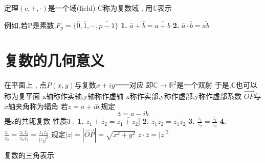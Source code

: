 \documentclass[UTF8,11pt]{ctexart}
\theoremstyle{cnthm}
\begin{document}
	定理$(c , + , \cdot)$是一个域(field)
	C称为复数域 , 用$\mathbb{C}$表示
	
	例如,若P是素数,$F_p = \{ \bar{0} , \bar{1} , \cdots , \bar{p-1} \}$
\noindent\textbf{1.} $\bar{a} + \bar{b} = \bar{a+b}$
\noindent\textbf{2.} $\bar{a} \cdot \bar{b} = \bar{ab}$

\section{复数的几何意义}

在平面上 , 点$P(x,y)$与复数$x+iy$一一对应
即$\mathbb{C} \to \mathbb{R}^2$是一个双射
于是,$\mathbb{C}$也可以称为复平面
x轴称作实轴,y轴称作虚轴
x称作实部,y称作虚部,y称作虚部系数
$\vec{OP}$与$x$轴夹角称为辐角
若$z = a+ib$,规定
\[
\bar{z} = a-ib
\]
是z的共轭复数
性质3 : 
\noindent\textbf{1.} $\bar{z_1}+\bar{z_2} = \bar{z_1+z_2]}$
\noindent\textbf{2.} $\bar{z_1}\bar{z_2} = \bar{z_1z_2}$
\noindent\textbf{3.} $\frac{\bar{z_1}}{\bar{z_2}} = \bar{\frac{z_1}{z_2}}$
\noindent\textbf{4.} $\frac{z_1}{z_2} = \frac{z_1\bar{z_2}}{z_2 \bar{z_2}} = \frac{z_1\bar{z_2}}{|z_2|^2}$
规定$|z| = |\vec{OP}| = \sqrt{x^2+y^2}$
$z \cdot \bar{z} = |z|^2$

复数的三角表示
\end{document}
